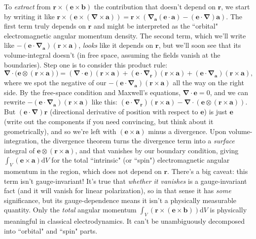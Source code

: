 \documentclass[12pt]{article}
\renewcommand{\vv}[1]{\mathbf{#1}}
\newcommand{\dd}[1]{\mathrm{d}#1}
\newcommand{\del}{\boldsymbol{\nabla}}
\begin{document}
To \emph{extract} from $\vv r \times (\vv e \times \vv b)$ the contribution that doesn't depend on $\vv r$, we start by writing it like $\vv r \times (\vv e \times (\del \times \vv a)) = \vv r \times (\del_{\vv a} (\vv e \cdot \vv a) - (\vv e \cdot \del) \vv a)$. The first term truly depends on $\vv r$ and might be interpreted as the ``orbital" electromagnetic angular momentum density. The second term, which we'll write like $- ( \vv e \cdot \del_{\vv a} ) ( \vv r \times \vv a )$, \emph{looks} like it depends on $\vv r$, but we'll soon see that its volume-integral doesn't (in free space, assuming the fields vanish at the boundaries). Step one is to consider this product rule:
\begin{equation*}
\del \cdot \bigl( \vv e \otimes \left( \vv r \times \vv a \right)  \bigr) = \left( \del \cdot \vv e \right) \left( \vv r \times \vv a \right) + \left( \vv e \cdot \del_{\vv r} \right) \left( \vv r \times \vv a \right) +  \left( \vv e \cdot \del_{\vv a} \right) \left( \vv r \times \vv a \right) ,
\end{equation*}
where we spot the negative of our $- ( \vv e \cdot \del_{\vv a} ) ( \vv r \times \vv a )$ all the way on the right side. By the free-space condition and Maxwell's equations, $\del \cdot \vv e = 0$, and we can rewrite $- ( \vv e \cdot \del_{\vv a} ) ( \vv r \times \vv a )$ like this: $ ( \vv e \cdot \del_{\vv r} ) ( \vv r \times \vv a ) - \del \cdot ( \vv e \otimes ( \vv r \times \vv a ) )$. But $(\vv e \cdot \del)\vv r$ (directional derivative of position with respect to $\vv e$) is just $\vv e$ (write out the components if you need convincing, but think about it geometrically), and so we're left with $(\vv e \times \vv a)$ minus a divergence. Upon volume-integration, the divergence theorem turns the divergence term into a \emph{surface} integral of $\vv e \otimes ( \vv r \times \vv a )$, and that vanishes by our boundary condition, giving $\int_V (\vv e \times \vv a) \dd V$ for the total ``intrinsic" (or ``spin") electromagnetic angular momentum in the region, which does not depend on $\vv r$. There's a big caveat: this term isn't gauge-invariant! It's true that \emph{whether it vanishes} is a gauge-invariant fact (and it will vanish for linear polarization), so in that sense it has \emph{some} significance, but its gauge-dependence means it isn't a physically measurable quantity. Only the \emph{total} angular momentum $\int_V (\vv r \times (\vv e \times \vv b)) \dd V$ is physically meaningful in classical electrodynamics. It can't be unambiguously decomposed into ``orbital" and ``spin" parts.
\end{document}
